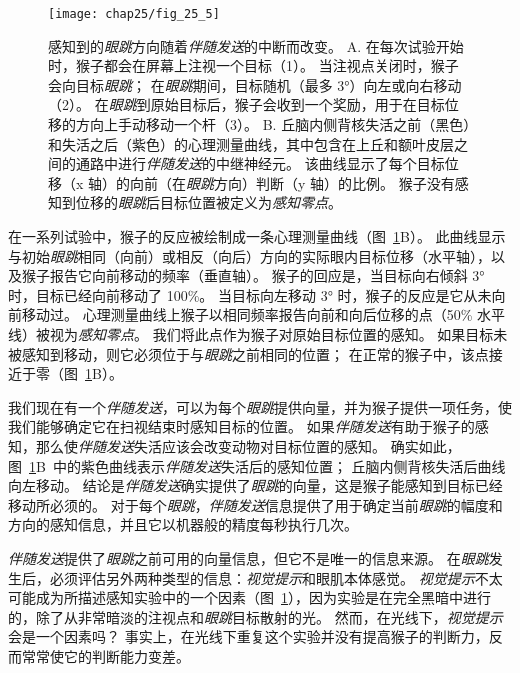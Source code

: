 \begin{figure}[htbp]
	\centering
	\texttt{[image: chap25/fig\_25\_5]}
	\caption{感知到的\textit{眼跳}方向随着\textit{伴随发送}的中断而改变。
		A. 在每次试验开始时，猴子都会在屏幕上注视一个目标（1）。
		当注视点关闭时，猴子会向目标\textit{眼跳}；
		在\textit{眼跳}期间，目标随机（最多 3°）向左或向右移动（2）。
		在\textit{眼跳}到原始目标后，猴子会收到一个奖励，用于在目标位移的方向上手动移动一个杆（3）。
		B. 丘脑内侧背核失活之前（黑色）和失活之后（紫色）的心理测量曲线，其中包含在上丘和额叶皮层之间的通路中进行\textit{伴随发送}的中继神经元。
		该曲线显示了每个目标位移（x 轴）的向前（在\textit{眼跳}方向）判断（y 轴）的比例。
		猴子没有感知到位移的\textit{眼跳}后目标位置被定义为\textit{感知零点}\cite{cavanaugh2016saccadic}。}
	\label{fig:25_5}
\end{figure}


在一系列试验中，猴子的反应被绘制成一条心理测量曲线（图~\ref{fig:25_5}B）。
此曲线显示与初始\textit{眼跳}相同（向前）或相反（向后）方向的实际眼内目标位移（水平轴），以及猴子报告它向前移动的频率（垂直轴）。
猴子的回应是，当目标向右倾斜 3° 时，目标已经向前移动了 100\%。
当目标向左移动 3° 时，猴子的反应是它从未向前移动过。
心理测量曲线上猴子以相同频率报告向前和向后位移的点（50\% 水平线）被视为\textit{感知零点}。
我们将此点作为猴子对原始目标位置的感知。
如果目标未被感知到移动，则它必须位于与\textit{眼跳}之前相同的位置；
在正常的猴子中，该点接近于零（图~\ref{fig:25_5}B）。


我们现在有一个\textit{伴随发送}，可以为每个\textit{眼跳}提供向量，并为猴子提供一项任务，使我们能够确定它在扫视结束时感知目标的位置。
如果\textit{伴随发送}有助于猴子的感知，那么使\textit{伴随发送}失活应该会改变动物对目标位置的感知。
确实如此，图~\ref{fig:25_5}B~中的紫色曲线表示\textit{伴随发送}失活后的感知位置；
丘脑内侧背核失活后曲线向左移动。
结论是\textit{伴随发送}确实提供了\textit{眼跳}的向量，这是猴子能感知到目标已经移动所必须的。
对于每个\textit{眼跳}，\textit{伴随发送}信息提供了用于确定当前\textit{眼跳}的幅度和方向的感知信息，并且它以机器般的精度每秒执行几次。


\textit{伴随发送}提供了\textit{眼跳}之前可用的向量信息，但它不是唯一的信息来源。
在\textit{眼跳}发生后，必须评估另外两种类型的信息：\textit{视觉提示}和眼肌本体感觉。
\textit{视觉提示}不太可能成为所描述感知实验中的一个因素（图~\ref{fig:25_5}），因为实验是在完全黑暗中进行的，除了从非常暗淡的注视点和\textit{眼跳}目标散射的光。
然而，在光线下，\textit{视觉提示}会是一个因素吗？
事实上，在光线下重复这个实验并没有提高猴子的判断力，反而常常使它的判断能力变差。


